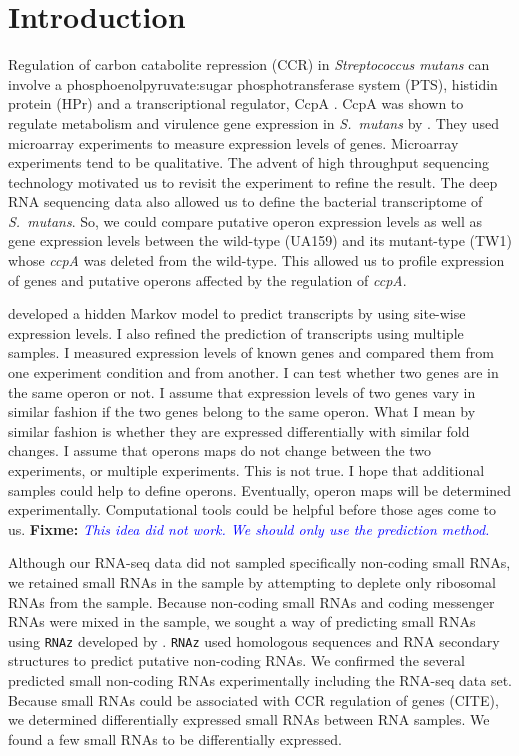\documentclass{article}
\newcommand{\program}[1]{{\texttt{#1}}}
\newcommand{\fixme}[1]{{\textbf{Fixme:} \textit{\textcolor{blue}{#1}}}}
\begin{document}
\section{Introduction}
Regulation of carbon catabolite repression (CCR) in \textit{Streptococcus
mutans} can involve a phosphoenolpyruvate:sugar phosphotransferase system (PTS),
histidin protein (HPr) and a transcriptional regulator, CcpA \citep{Gorke2008}.
CcpA was shown to regulate metabolism and virulence gene expression in
\textit{S.\ mutans} by \citet{Abranches2008}. They used microarray experiments
to measure expression levels of genes. Microarray experiments tend to be
qualitative. The advent of high throughput sequencing technology motivated us to
revisit the experiment to refine the result.  The deep RNA sequencing data also
allowed us to define the bacterial transcriptome of \textit{S.\ mutans}. So, we
could compare putative operon expression levels as well as gene expression
levels between the wild-type (UA159) and its mutant-type (TW1) whose
\textit{ccpA} was deleted from the wild-type. This allowed us to profile
expression of genes and putative operons affected by the regulation of
\textit{ccpA}. 

\citet{Martin2010} developed a hidden Markov model to predict transcripts by
using site-wise expression levels. I also refined the prediction of transcripts
using multiple samples. I measured expression levels of known genes and compared
them from one experiment condition and from another. I can test whether two
genes are in the same operon or not. I assume that expression levels of two genes 
vary in similar fashion if the two genes belong to the same operon. What I mean
by similar fashion is whether they are expressed differentially with similar
fold changes. I assume that operons maps do not change between the two
experiments, or multiple experiments. This is not true. I hope that additional
samples could help to define operons. Eventually, operon maps will be determined
experimentally. Computational tools could be helpful before those ages come to
us. \fixme{This idea did not work. We should only use the prediction method.}

Although our RNA-seq data did not sampled specifically non-coding small RNAs, we
retained small RNAs in the sample by attempting to deplete only ribosomal RNAs
from the sample. Because non-coding small RNAs and coding messenger RNAs were
mixed in the sample, we sought a way of predicting small RNAs using
\program{RNAz} developed by \citet{Gruber2010}.  \program{RNAz} used homologous
sequences and RNA secondary structures to predict putative non-coding RNAs. We
confirmed the several predicted small non-coding RNAs experimentally
\citep{Altuvia2007} including the RNA-seq data set. Because small RNAs could
be associated with CCR regulation of genes (CITE), we determined differentially expressed small
RNAs between RNA samples. We found a few small RNAs to be differentially
expressed.
\end{document}
